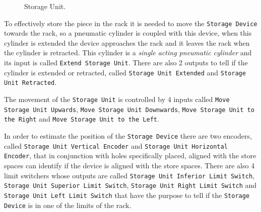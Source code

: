 \begin{figure}[H]
  \centering
  \caption{Storage Unit.}
  \label{fig:storageUnit}
\end{figure}
To effectively store the piece in the rack it is needed to move the
\verb|Storage Device| towards the rack, so a pneumatic cylinder is coupled with
this device, when this cylinder is extended the device approaches the rack and
it leaves the rack when the cylinder is retracted. This cylinder is a
\emph{single acting pneumatic cylinder} and its input is called
\verb|Extend Storage Unit|. There are also 2 outputs to tell if the cylinder is
extended or retracted, called \verb|Storage Unit Extended| and
\verb|Storage Unit Retracted|.

The movement of the \verb|Storage Unit| is controlled by 4 inputs called \linebreak
\verb|Move Storage Unit Upwards|, \verb|Move Storage Unit Downwards|, \newline
\verb|Move Storage Unit to the Right| and
\verb|Move Storage Unit to the Left|.

In order to estimate the position of the \verb|Storage Device|  there are two
encoders, called \verb|Storage Unit Vertical Encoder| and
\verb|Storage Unit Horizontal Encoder|, that in conjunction with holes
specifically placed, aligned with the store spaces can identify if the device is
aligned with the store spaces. There are also 4 limit switchers  whose outputs
are called
\verb|Storage Unit Inferior Limit Switch|,
\verb|Storage Unit Superior Limit Switch|,
\verb|Storage Unit Right Limit Switch| and
\verb|Storage Unit Left Limit Switch| that have the purpose to tell if the
\verb|Storage Device| is in one of the limits of the rack.


